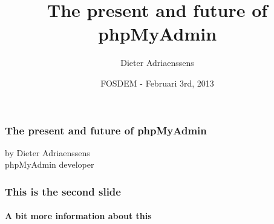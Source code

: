 \documentclass{beamer}
\title{The present and future of phpMyAdmin}
\author{Dieter Adriaenssens}
\institute{phpMyAdmin}
\date{FOSDEM - Februari 3rd, 2013}
\begin{document}
  \begin{frame}
  \frametitle{The present and future of phpMyAdmin}
    by Dieter Adriaenssens\\
    phpMyAdmin developer
  \end{frame}
  \begin{frame}
  \frametitle{This is the second slide}
  \framesubtitle{A bit more information about this}
  \end{frame}
\end{document}
